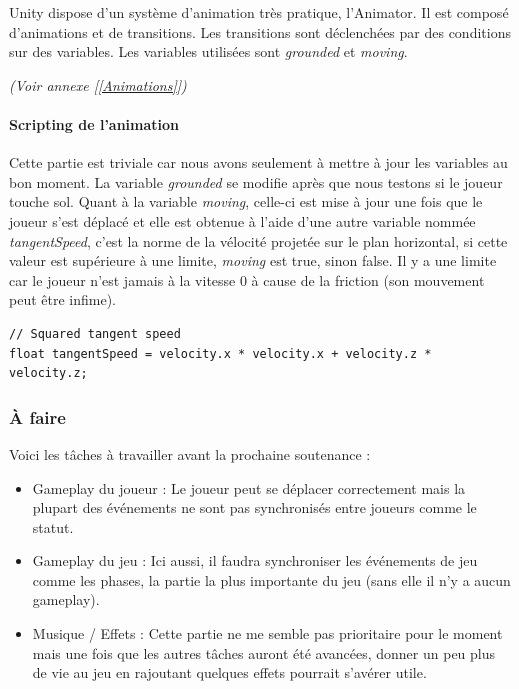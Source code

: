 \documentclass{article}
\begin{document}
Unity dispose d'un système d'animation très pratique, l'Animator. Il est composé d'animations et de transitions. Les transitions sont déclenchées par des conditions sur des variables. Les variables utilisées sont \emph{grounded} et \emph{moving}.

\emph{(Voir annexe [\ref{Animations}])}

\paragraph{Scripting de l'animation}
Cette partie est triviale car nous avons seulement à mettre à jour les variables au bon moment. La variable \emph{grounded} se modifie après que nous testons si le joueur touche sol. Quant à la variable \emph{moving}, celle-ci est mise à jour une fois que le joueur s'est déplacé et elle est obtenue à l'aide d'une autre variable nommée \emph{tangentSpeed}, c'est la norme de la vélocité projetée sur le plan horizontal, si cette valeur est supérieure à une limite, \emph{moving} est true, sinon false. Il y a une limite car le joueur n'est jamais à la vitesse 0 à cause de la friction (son mouvement peut être infime).

\begin{lstlisting}
// Squared tangent speed
float tangentSpeed = velocity.x * velocity.x + velocity.z * velocity.z;
\end{lstlisting}

\newpage
\subsubsection{À faire}

Voici les tâches à travailler avant la prochaine soutenance :

\begin{itemize}

\item Gameplay du joueur : Le joueur peut se déplacer correctement mais la plupart des événements ne sont pas synchronisés entre joueurs comme le statut.

\item Gameplay du jeu : Ici aussi, il faudra synchroniser les événements de jeu comme les phases, la partie la plus importante du jeu (sans elle il n'y a aucun gameplay).

\item Musique / Effets : Cette partie ne me semble pas prioritaire pour le moment mais une fois que les autres tâches auront été avancées, donner un peu plus de vie au jeu en rajoutant quelques effets pourrait s'avérer utile.

\end{itemize}
\end{document}
